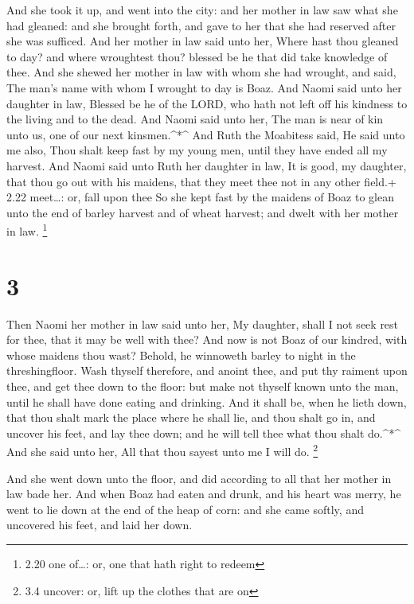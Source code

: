 And she took it up, and went into the city: and her mother
in law saw what she had gleaned: and she brought forth, and gave to her
that she had reserved after she was sufficed.  And her
mother in law said unto her, Where hast thou gleaned to day? and where
wroughtest thou? blessed be he that did take knowledge of thee. And she
shewed her mother in law with whom she had wrought, and said, The man's
name with whom I wrought to day is Boaz.  And Naomi said
unto her daughter in law, Blessed be he of the LORD, who hath not left
off his kindness to the living and to the dead. And Naomi said unto her,
The man is near of kin unto us, one of our next kinsmen.\^{}*\^{}
 And Ruth the Moabitess said, He said unto me also, Thou
shalt keep fast by my young men, until they have ended all my harvest.
 And Naomi said unto Ruth her daughter in law, It is good,
my daughter, that thou go out with his maidens, that they meet thee not
in any other field.+ 2.22 meet\ldots: or, fall upon thee 
So she kept fast by the maidens of Boaz to glean unto the end of barley
harvest and of wheat harvest; and dwelt with her mother in law.
\footnote{2.20 one of\ldots: or, one that hath right to redeem}

\hypertarget{section-2}{%
\section{3}\label{section-2}}

 Then Naomi her mother in law said unto her, My daughter,
shall I not seek rest for thee, that it may be well with thee?
 And now is not Boaz of our kindred, with whose maidens thou
wast? Behold, he winnoweth barley to night in the threshingfloor.
 Wash thyself therefore, and anoint thee, and put thy
raiment upon thee, and get thee down to the floor: but make not thyself
known unto the man, until he shall have done eating and drinking.
 And it shall be, when he lieth down, that thou shalt mark
the place where he shall lie, and thou shalt go in, and uncover his
feet, and lay thee down; and he will tell thee what thou shalt
do.\^{}*\^{}  And she said unto her, All that thou sayest
unto me I will do. \footnote{3.4 uncover: or, lift up the clothes that
  are on}

 And she went down unto the floor, and did according to all
that her mother in law bade her.  And when Boaz had eaten
and drunk, and his heart was merry, he went to lie down at the end of
the heap of corn: and she came softly, and uncovered his feet, and laid
her down.

